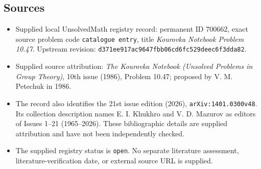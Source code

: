\documentclass[11pt]{article}
\begin{document}
\subsection{Sources}
\begin{itemize}
\item Supplied local UnsolvedMath registry record: permanent ID \(700662\), exact source problem code \texttt{catalogue entry}, title \emph{Kourovka Notebook Problem 10.47}. Upstream revision: \texttt{d371ee917ac9647fbb06cd6fc529deec6f3dda82}.
\item Supplied source attribution: \emph{The Kourovka Notebook (Unsolved Problems in Group Theory)}, 10th issue (1986), Problem 10.47; proposed by V. M. Petechuk in 1986.
\item The record also identifies the 21st issue edition (2026), \texttt{arXiv:1401.0300v48}. Its collection description names E. I. Khukhro and V. D. Mazurov as editors of Issues 1--21 (1965--2026). These bibliographic details are supplied attribution and have not been independently checked.
\item The supplied registry status is \texttt{open}. No separate literature assessment, literature-verification date, or external source URL is supplied.
\end{itemize}
\end{document}
